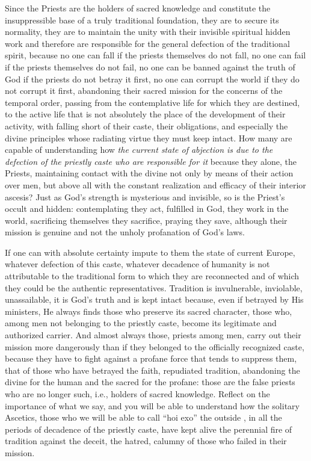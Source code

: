 Since the Priests are the holders of sacred knowledge and constitute the insuppressible base of a truly traditional foundation, they are to secure its normality, they are to maintain the unity with their invisible spiritual hidden work and therefore are responsible for the general defection of the traditional spirit, because no one can fall if the priests themselves do not fall, no one can fail if the priests themselves do not fail, no one can be banned against the truth of God if the priests do not betray it first, no one can corrupt the world if they do not corrupt it first, abandoning their sacred mission for the concerns of the temporal order, passing from the contemplative life for which they are destined, to the active life that is not absolutely the place of the development of their activity, with falling short of their caste, their obligations, and especially the divine principles whose radiating virtue they must keep intact. How many are capable of understanding how \emph{the current state of abjection is due to the defection of the priestly caste who are responsible for it} because they alone, the Priests, maintaining contact with the divine not only by means of their action over men, but above all with the constant realization and efficacy of their interior ascesis? Just as God's strength is mysterious and invisible, so is the Priest's occult and hidden: contemplating they act, fulfilled in God, they work in the world, sacrificing themselves they sacrifice, praying they save, although their mission is genuine and not the unholy profanation of God's laws.

If one can with absolute certainty impute to them the state of current Europe, whatever defection of this caste, whatever decadence of humanity is not attributable to the traditional form to which they are reconnected and of which they could be the authentic representatives. Tradition is invulnerable, inviolable, unassailable, it is God's truth and is kept intact because, even if betrayed by His ministers, He always finds those who preserve its sacred character, those who, among men not belonging to the priestly caste, become its legitimate and authorized carrier. And almost always those, priests among men, carry out their mission more dangerously than if they belonged to the officially recognized caste, because they have to fight against a profane force that tends to suppress them, that of those who have betrayed the faith, repudiated tradition, abandoning the divine for the human and the sacred for the profane: those are the false priests who are no longer such, i.e., holders of sacred knowledge. Reflect on the importance of what we say, and you will be able to understand how the solitary Ascetics, those who we will be able to call ``hoi exo'' the outside , in all the periods of decadence of the priestly caste, have kept alive the perennial fire of tradition against the deceit, the hatred, calumny of those who failed in their mission.

